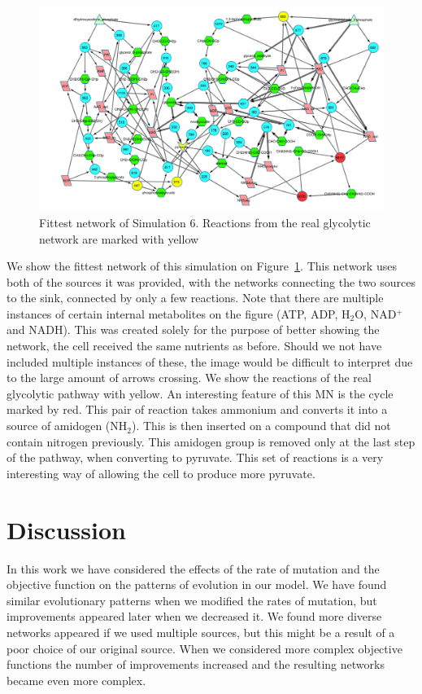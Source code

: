 \documentclass[a4paper,12pt]{article}
\begin{document}
\begin{figure}[htpb]
	\centering
	\includegraphics[width=1\linewidth]{sim6network.pdf}
	\caption{Fittest network of Simulation 6. Reactions from the real glycolytic network are marked with yellow}
	\label{fig:sim6network}
\end{figure}

We show the fittest network of this simulation on Figure~\ref{fig:sim6network}. This network uses both of the sources it was provided, with the networks connecting the two sources to the sink, connected by only a few reactions. Note that there are multiple instances of certain internal metabolites on the figure (ATP, ADP, H$_2$O, NAD$^+$ and NADH). This was created solely for the purpose of better showing the network, the cell received the same nutrients as before. Should we not have included multiple instances of these, the image would be difficult to interpret due to the large amount of arrows crossing. We show the reactions of the real glycolytic pathway with yellow. An interesting feature of this MN is the cycle marked by red. This pair of reaction takes ammonium and converts it into a source of amidogen (NH$_2$). This is then inserted on a compound that did not contain nitrogen previously. This amidogen group is removed only at the last step of the pathway, when converting to pyruvate. This set of reactions is a very interesting way of allowing the cell to produce more pyruvate. 


\section{Discussion}
\label{sec:discussion}

In this work we have considered the effects of the rate of mutation and the objective function on the patterns of evolution in our model. We have found similar evolutionary patterns when we modified the rates of mutation, but improvements appeared later when we decreased it. We found more diverse networks appeared if we used multiple sources, but this might be a result of a poor choice of our original source. When we considered more complex objective functions the number of improvements increased and the resulting networks became even more complex. 
\end{document}
